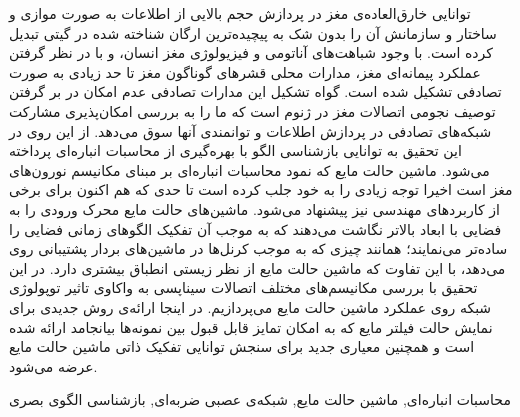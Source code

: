 \begin{abstract_fa}

توانایی خارق‌العاده‌ی مغز در پردازش حجم بالایی از اطلاعات به صورت موازی و ساختار و سازمانش آن را بدون شک به پیچیده‌ترین ارگان شناخته شده در گیتی تبدیل کرده است. با وجود شباهت‌های آناتومی و فیزیولوژی مغز انسان، و با در نظر گرفتن عملکرد پیمانه‌ای مغز، مدارات محلی قشرهای گوناگون مغز تا حد زیادی به صورت تصادفی تشکیل شده است. گواه تشکیل این مدارات تصادفی عدم امکان در بر گرفتن توصیف نجومی اتصالات مغز در ژنوم است که ما را به بررسی امکان‌پذیری مشارکت شبکه‌های تصادفی در پردازش اطلاعات و توانمندی آنها سوق می‌دهد. از این روی در این تحقیق به توانایی بازشناسی الگو با بهره‌گیری از محاسبات انباره‌ای پرداخته می‌شود. ماشین حالت مایع که نمود محاسبات انباره‌ای بر مبنای مکانیسم نورون‌های مغز است اخیرا توجه زیادی را به خود جلب کرده است تا حدی که هم اکنون برای برخی از کاربردهای مهندسی نیز پیشنهاد می‌شود. ماشین‌های حالت مایع محرک ورودی را به فضایی با ابعاد بالاتر نگاشت می‌دهند که به موجب آن تفکیک الگوهای زمانی فضایی را ساده‌تر می‌نمایند؛ همانند چیزی که به موجب کرنل‌ها در ماشین‌های بردار پشتیبانی روی می‌دهد، با این تفاوت که ماشین حالت مایع از نظر زیستی انطباق بیشتری دارد. در این تحقیق با بررسی مکانیسم‌های مختلف اتصالات سیناپسی به واکاوی تاثیر توپولوژی شبکه روی عملکرد ماشین حالت مایع می‌پردازیم. در اینجا ارائه‌ی روش جدیدی برای نمایش حالت فیلتر مایع که به امکان تمایز قابل قبول بین نمونه‌ها بیانجامد ارائه شده است و همچنین معیاری جدید برای سنجش توانایی تفکیک ذاتی ماشین حالت مایع عرضه می‌شود.

\end{abstract_fa}
\begin{keyword_fa}
محاسبات انباره‌ای\sep
ماشین حالت مایع\sep
شبکه‌ی عصبی ضربه‌ای\sep
بازشناسی الگوی بصری
\end{keyword_fa}